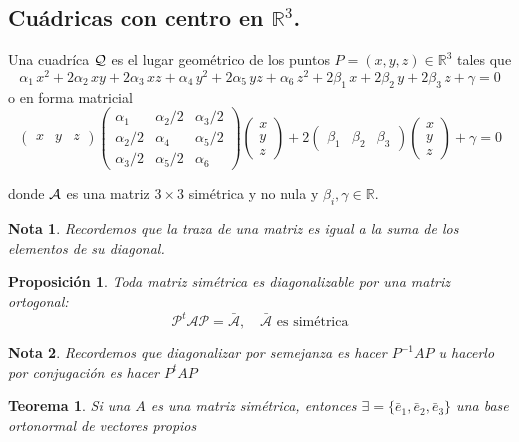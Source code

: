 \documentclass[11pt, a4paper, titlepage]{article}
\theoremstyle{theorem-style}
\newtheorem*{nth}{Teorema}
\newtheorem*{nprop}{Proposición}
\theoremstyle{definition-style}
\theoremstyle{remark-style}
\newtheorem*{nota}{Nota}
\theoremstyle{example-style}
\begin{document}
\subsection{Cu\'adricas con centro en $\mathbb{R}^3$.}


Una cuadr\'ica  $\cal Q$ es el lugar geom\'etrico de los puntos $P=(x,y,z)\in\mathbb{R}^3$ tales que
\[ 
\alpha_1 \,x^2 + 2\alpha_2 \,x y + 2\alpha_3\,x z + \alpha_4 \,y^2 + 2 \alpha_5 \,y z + \alpha_6 \,z^2 
+ 2\beta_1 \,x+ 2\beta_2 \,y +2 \beta_3 \,z + \gamma = 0
\]
o en forma matricial 
\[  
\left( \begin{array}{ccc} 
x & y & z   
 \end{array} \right)\begin{pmatrix}
 \alpha_1 & \alpha_2 / 2 &\alpha_3 / 2\\
 \alpha_2 / 2 & \alpha_4 &\alpha_5 / 2\\
 \alpha_3 / 2& \alpha_5 / 2& \alpha_6
\end{pmatrix} 
\left(\begin{array}{c}
x \\
y \\
z
\end{array} \right)
+
 2\left( \begin{array}{ccc}
\beta_1 & \beta_2 & \beta_3   
 \end{array} \right)
\left( \begin{array}{c}
x \\
y \\
z
 \end{array} \right)
+ \gamma = 0
\]

donde $\cal A$ es una matriz $3\times 3$ sim\'etrica y no nula y $\beta_i, \gamma\in\mathbb{R}$. 

\begin{nota}
	Recordemos que la traza de una matriz es igual a la suma de los elementos de su diagonal.
\end{nota}

\begin{nprop}
	Toda matriz simétrica es diagonalizable por una matriz ortogonal:
	\[
	\mathcal P ^t \mathcal A \mathcal P = \bar{ \mathcal A}, \quad \text{$\bar{\mathcal A}$ es simétrica}
	\]
\end{nprop}
\begin{nota}
	Recordemos que diagonalizar por semejanza es hacer $P^{-1}AP$ u hacerlo por conjugación es hacer $P^t A P$
\end{nota}

\begin{nth}
	Si una $A$ es una matriz simétrica, entonces $\exists = \{\bar e_1, \bar e_2, \bar e_3\}$ una base ortonormal de vectores propios
\end{nth}
\end{document}
